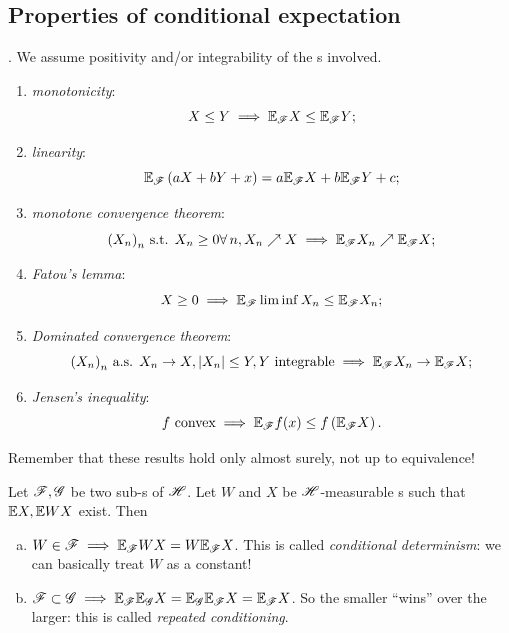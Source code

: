 \documentclass{report}
\begin{document}
\subsection{Properties of conditional expectation}.
We assume positivity and/or integrability of the \rv s involved. 
\begin{enumerate}[\circnum]
	\item \emph{monotonicity}:
	\[X\leq Y\implies\mathbb{E}_{\mathscr{F}} X\leq\mathbb{E}_{\mathscr{F}} Y;\]
	\item \emph{linearity}:
	\[\mathbb{E}_{\mathscr{F}}\left(aX+bY+x\right)=a\mathbb{E}_{\mathscr{F}} X+b\mathbb{E}_{\mathscr{F}} Y+c;\]
	\item \emph{monotone convergence theorem}:
	\[{(X_{n})}_{n}\text{ s.t. }X_{n}\geq 0\forall\, n,X_n\nearrow X\implies\mathbb{E}_{\mathscr{F}} X_n\nearrow\mathbb{E}_{\mathscr{F}} X;\]
	\item \emph{Fatou's lemma}:
	\[X\geq0\implies \mathbb{E}_{\mathscr{F}}\liminf X_n\leq\mathbb{E}_{\mathscr{F}} X_n;\]
	\item \emph{Dominated convergence theorem}:
	\[{(X_{n})}_{n}\text{ a.s. }X_n\to X,|X_n|\leq Y,Y\text{ integrable}\implies\mathbb{E}_{\mathscr{F}} X_n\to\mathbb{E}_{\mathscr{F}} X;\]
	\item \emph{Jensen's inequality}:
	\[f\text{ convex}\implies \mathbb{E}_{\mathscr{F}} f(x)\leq f\left(\mathbb{E}_{\mathscr{F}} X\right).\]
\end{enumerate}
Remember that these results hold only almost surely, not up to equivalence!
\begin{theorem}
	Let $\mathscr{F},\mathscr{G}$ be two sub-\sa{}s of $\mathscr{H}$. Let $W$ and $X$ be $\mathscr{H}$-measurable \rv{}s such that $\mathbb{E} X,\mathbb{E} WX$ exist. Then
	\begin{enumerate}[a)]
		\item $W\in\mathscr{F}\implies\mathbb{E}_{\mathscr{F}} WX=W\mathbb{E}_{\mathscr{F}} X$. This is called \emph{conditional determinism}: we can basically treat $W$ as a constant!
		\item $\mathscr{F} \subset\mathscr{G}\implies\mathbb{E}_{\mathscr{F}}\mathbb{E}_{\mathscr{G}} X=\mathbb{E}_{\mathscr{G}}\mathbb{E}_{\mathscr{F}} X=\mathbb{E}_{\mathscr{F}} X$. So the smaller \sa{} ``wins'' over the larger: this is called \emph{repeated conditioning}.
	\end{enumerate}
\end{theorem}
\end{document}
